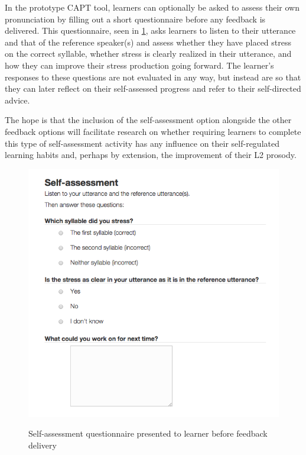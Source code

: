  	
 	In the prototype CAPT tool, learners can optionally be asked to assess their own pronunciation by filling out a short questionnaire  before any feedback is delivered. This questionnaire, seen in \cref{fig:selfassess}, asks learners to listen to their utterance and that of the reference speaker(s) and assess whether they have placed stress on the correct syllable, whether stress is clearly realized in their utterance, and how they can improve their stress production going forward. The learner's responses to these questions are not evaluated in any way, but instead are  so that they can later reflect on their self-assessed progress and refer to their self-directed advice. 
 	
 	The hope is that the inclusion of the self-assessment option alongside the other feedback options will facilitate research on
 	whether requiring learners to complete this type of self-assessment activity has any influence on their self-regulated learning habits and, perhaps by extension, the improvement of their L2 prosody.
 	
 	
 	\begin{figure}
		\centering
		\caption{Self-assessment questionnaire presented to learner before feedback delivery}
		\includegraphics[width=.7\textwidth]{img/screenshots/selfAssessment}
		\label{fig:selfassess}
	\end{figure}
		
		
		
%	
%


















